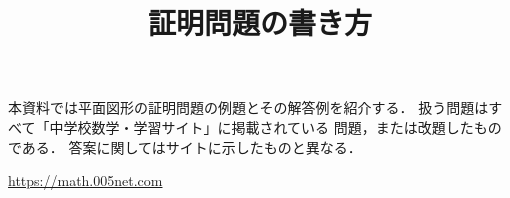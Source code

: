 \documentclass[dvipdfmx]{jsarticle}
\title{証明問題の書き方}
\author{}
\date{}
\begin{document}
	\maketitle
	本資料では平面図形の証明問題の例題とその解答例を紹介する．
	扱う問題はすべて「中学校数学・学習サイト」に掲載されている
	問題，または改題したものである．
	答案に関してはサイトに示したものと異なる．

	\url{https://math.005net.com}

	
	
\end{document}
